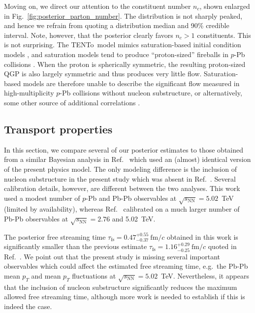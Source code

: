 \documentclass[aps,prc,reprint,amsmath,nofootinbib]{revtex4-1}
\newcommand{\trento}{T\raisebox{-0.5ex}{R}ENTo}
\newcommand{\sqrts}{\sqrt{s_\mathrm{NN}}}
\newcommand{\fmc}{\ensuremath{\text{fm}/c}}
\newcommand{\taufs}{\tau_\text{fs}}
\begin{document}
Moving on, we direct our attention to the constituent number $n_c$, shown enlarged in Fig.~\ref{fig:posterior_parton_number}.
The distribution is not sharply peaked, and hence we refrain from quoting a distribution median and 90\% credible interval.
Note, however, that the posterior clearly favors $n_c > 1$ constituents.
This is not surprising.
The \trento\ model mimics saturation-based initial condition models \cite{Bernhard:2016tnd}, and saturation models tend to produce ``proton-sized'' fireballs in $p$-Pb collisions \cite{Bzdak:2013zma}.
When the proton is spherically symmetric, the resulting proton-sized QGP is also largely symmetric and thus produces very little flow.
Saturation-based models are therefore unable to describe the significant flow measured in high-multiplicity $p$-Pb collisions without nucleon substructure, or alternatively, some other source of additional correlations \cite{Schenke:2017bog}.

\subsection{Transport properties}

In this section, we compare several of our posterior estimates to those obtained from a similar Bayesian analysis in Ref.~\cite{Bernhard:2018hnz} which used an (almost) identical version of the present physics model.
The only modeling difference is the inclusion of nucleon substructure in the present study which was absent in Ref.~\cite{Bernhard:2018hnz}.
Several calibration details, however, are different between the two analyses.
This work used a modest number of $p$-Pb and Pb-Pb observables at $\sqrts=5.02$~TeV (limited by availability), whereas Ref.~\cite{Bernhard:2018hnz} calibrated on a much larger number of Pb-Pb observables at $\sqrts=2.76$ and 5.02~TeV.

The posterior free streaming time $\taufs=0.47_{-0.37}^{+0.55}~\fmc$ obtained in this work is significantly smaller than the previous estimate $\taufs=1.16_{-0.25}^{+0.29}\ \fmc$ quoted in Ref.~\cite{Bernhard:2018hnz}.
We point out that the present study is missing several important observables which could affect the estimated free streaming time, e.g.\ the Pb-Pb mean $p_T$ and mean $p_T$ fluctuations at $\sqrts=5.02$~TeV.
Nevertheless, it appears that the inclusion of nucleon substructure significantly reduces the maximum allowed free streaming time, although more work is needed to establish if this is indeed the case.
\end{document}
